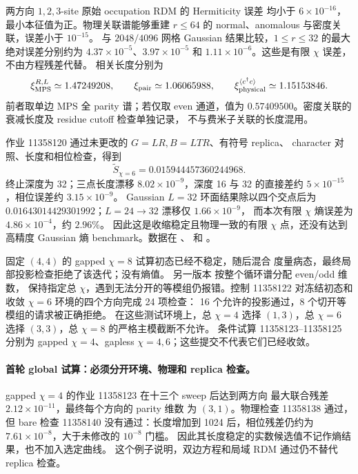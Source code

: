 两方向 $1,2,3$-site 原始 occupation RDM 的 Hermiticity 误差
均小于 $6\times10^{-16}$，最小本征值为正。物理关联谱能够重建
$r\leq64$ 的 normal、anomalous 与密度关联，误差小于 $10^{-15}$。
与 $2048/4096$ 网格 Gaussian 结果比较，$1\leq r\leq32$ 的最大
绝对误差分别约为 $4.37\times10^{-5}$、$3.97\times10^{-5}$ 和
$1.11\times10^{-6}$。这些是有限 $\chi$ 误差，不由方程残差代替。
相关长度分别为
\[
 \xi_{\rm MPS}^{R,L}\simeq1.47249208,\qquad
 \xi_{\rm pair}\simeq1.06065988,\qquad
 \xi_{\rm physical}^{\langle c^\dagger c\rangle}\simeq1.15153846.
\]
前者取单边 MPS 全 parity 谱；若仅取 even 通道，值为
$0.57409500$。密度关联的衰减长度及 residue cutoff 检查单独记录，
不与费米子关联的长度混用。

作业 11358120 通过未更改的 $G=LR,B=LTR$、有符号 replica、
character 对照、长度和相位检查，得到
\[
 \widetilde S_{\chi=6}=0.015944457360244968.
\]
终止深度为 32；三点长度漂移 $8.02\times10^{-9}$，深度 16 与 32
的直接差约 $5\times10^{-15}$，相位误差约 $3.15\times10^{-9}$。
Gaussian $L=32$ 环面结果除以四个交点后为
$0.01643014429301992$；$L=24\to32$ 漂移仅 $1.66\times10^{-9}$，
而本次有限 $\chi$ 熵误差为 $4.86\times10^{-4}$，约 $2.96\%$。
因此这是收缩稳定且物理一致的有限 $\chi$ 点，还没有达到高精度
Gaussian 熵 benchmark。数据在 、
 和 。

固定 $(4,4)$ 的 gapped $\chi=8$ 试算初态已经不稳定，随后混合
度量病态，最终局部投影检查拒绝了该迭代；没有熵值。
另一版本  按整个循环谱分配 even/odd 维数，
保持指定总 $\chi$，遇到无法分开的等模组仍报错。控制 11358122
对冻结初态和收敛 $\chi=6$ 环境的四个方向完成 24 项检查：
16 个允许的投影通过，8 个切开等模组的请求被正确拒绝。
在这些测试环境上，总 $\chi=4$ 选择 $(1,3)$，总 $\chi=6$ 选择
$(3,3)$，总 $\chi=8$ 的严格主模截断不允许。
条件试算 11358123--11358125 分别为 gapped $\chi=4$、gapless
$\chi=4,6$；这些提交不代表它们已经收敛。


\paragraph{首轮 global 试算：必须分开环境、物理和 replica 检查。}
gapped $\chi=4$ 的作业 11358123 在十三个 sweep 后达到两方向
最大联合残差 $2.12\times10^{-11}$，最终每个方向的 parity 维数
为 $(3,1)$。物理检查 11358138 通过，但 bare 检查 11358140
没有通过：长度增加到 1024 后，相位残差仍约为
$7.61\times10^{-8}$，大于未修改的 $10^{-8}$ 门槛。
因此其长度稳定的实数候选值不记作熵结果，也不加入选定曲线。
这个例子说明，双边方程和局域 RDM 通过仍不替代 replica 检查。

